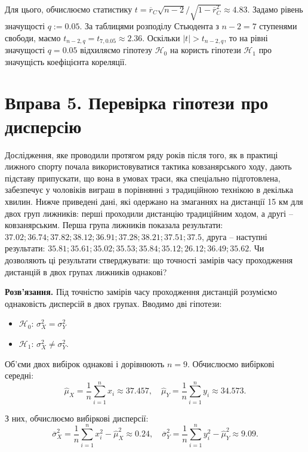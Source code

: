 \documentclass{../hw_template}
\begin{document}
Для цього, обчислюємо статистику $t=\overline{r}_C\sqrt{n-2}\Big/\sqrt{1-\overline{r}_C^2} \approx 4.83$. Задамо рівень 
значущості $q:=0.05$. За таблицями розподілу Стьюдента з $n-2=7$ ступенями свободи, маємо $t_{n-2,q} = t_{7,0.05} \approx 2.36$.
Оскільки $|t| > t_{n-2,q}$, то на рівні значущості $q=0.05$ відхиляємо гіпотезу $\mathcal{H}_0$ на користь гіпотези $\mathcal{H}_1$
про значущість коефіцієнта кореляції.

\newpage

\section{Вправа 5. Перевірка гіпотези про дисперсію}

\begin{problem}
    Дослідження, яке проводили протягом ряду років після того, як в практиці
    лижного спорту почала використовуватися тактика ковзанярського ходу, дають
    підставу припускати, що вона в умовах траси, яка спеціально підготовлена,
    забезпечує у чоловіків виграш в порівнянні з традиційною технікою в декілька
    хвилин. Нижче приведені дані, які одержано на змаганнях на дистанції 15 км
    для двох груп лижників: перші проходили дистанцію традиційним ходом, а другі
    – ковзанярським. Перша група лижників показала результати: $37.02; 36.74;
    37.82; 38.12; 36.91; 37.28; 38.21; 37.51; 37.5$, друга – наступні результати:
    $35.81; 35.61; 35.02; 35.53; 35.84; 35.12; 26.12; 36.49; 35.62$. Чи дозволяють
    ці результати стверджувати: що точності замірів часу проходження дистанцій в
    двох групах лижників однакові?
\end{problem}

\textbf{Розв'язання.} Під точністю замірів часу проходження дистанцій 
розуміємо однаковість дисперсій в двох групах. Вводимо дві гіпотези:
\begin{itemize}
    \item $\mathcal{H}_0$: $\sigma_X^2 = \sigma_Y^2$
    \item $\mathcal{H}_1$: $\sigma_X^2 \neq \sigma_Y^2$.
\end{itemize}

Об'єми двох вибірок однакові і дорівнюють $n=9$. Обчислюємо вибіркові середні:
\begin{equation*}
    \hat{\mu}_X = \frac{1}{n}\sum_{i=1}^n x_i \approx 37.457, \quad \hat{\mu}_Y = \frac{1}{n}\sum_{i=1}^n y_i \approx 34.573.
\end{equation*}

З них, обчислюємо вибіркові дисперсії:
\begin{equation*}
    \overline{\sigma}_X^2 = \frac{1}{n}\sum_{i=1}^n x_i^2 - \hat{\mu}_X^2 \approx 0.24, \quad \overline{\sigma}_Y^2 = \frac{1}{n}\sum_{i=1}^n y_i^2 - \hat{\mu}_Y^2 \approx 9.09.
\end{equation*}
\end{document}
